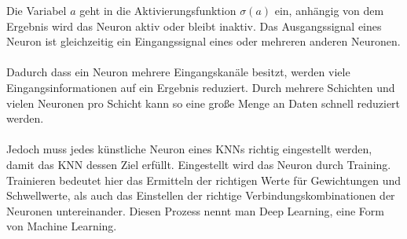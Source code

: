\documentclass[12pt,oneside,a4paper,parskip]{scrbook}
\begin{document}
Die Variabel $a$ geht in die Aktivierungsfunktion ${\sigma (a)}$ ein, anhängig von dem Ergebnis wird das Neuron aktiv oder bleibt inaktiv.
Das Ausgangssignal eines Neuron ist gleichzeitig ein Eingangssignal eines oder mehreren anderen Neuronen. %
\\\\
Dadurch dass ein Neuron mehrere Eingangskanäle besitzt, werden viele Eingangsinformationen auf ein Ergebnis reduziert. Durch mehrere Schichten und vielen Neuronen pro Schicht kann so eine große Menge an Daten schnell reduziert werden.
\\\\
Jedoch muss jedes künstliche Neuron eines KNNs richtig eingestellt werden, damit das KNN dessen Ziel erfüllt. Eingestellt wird das Neuron durch Training. Trainieren bedeutet hier das Ermitteln der richtigen Werte für Gewichtungen und Schwellwerte, als auch das Einstellen der richtige Verbindungskombinationen der Neuronen untereinander. Diesen Prozess nennt man Deep Learning, eine Form von Machine Learning.
\end{document}
